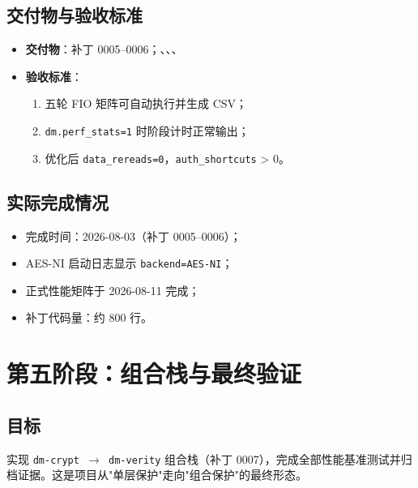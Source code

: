 \subsection{交付物与验收标准}
\begin{itemize}
    \item \textbf{交付物}：补丁 0005--0006；\texttt{}、\texttt{}、\texttt{}、\texttt{}
    \item \textbf{验收标准}：
    \begin{enumerate}
        \item 五轮 FIO 矩阵可自动执行并生成 CSV；
        \item \texttt{dm.perf\_stats=1} 时阶段计时正常输出；
        \item 优化后 \texttt{data\_rereads=0}，\texttt{auth\_shortcuts} > 0。
    \end{enumerate}
\end{itemize}

\subsection{实际完成情况}
\begin{itemize}
    \item 完成时间：2026-08-03（补丁 0005--0006）；
    \item AES-NI 启动日志显示 \texttt{backend=AES-NI}；
    \item 正式性能矩阵于 2026-08-11 完成；
    \item 补丁代码量：约 800 行。
\end{itemize}

\section{第五阶段：组合栈与最终验证}

\subsection{目标}
实现 \texttt{dm-crypt $\to$ dm-verity} 组合栈（补丁 0007），完成全部性能基准测试并归档证据。这是项目从"单层保护"走向"组合保护"的最终形态。

